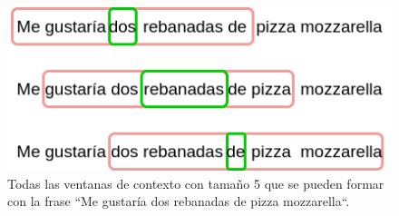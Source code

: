 \begin{figure}
    \centering
    \includegraphics[scale=0.60]{figures/context_example_1.png}
    \caption{Todas las ventanas de contexto con tamaño 5 que se pueden formar
             con la frase ``Me gustaría dos rebanadas de pizza mozzarella``.}
    \label{fig:wb_slices}
\end{figure}

